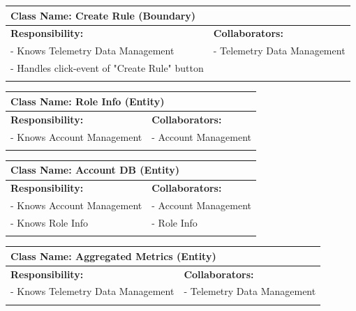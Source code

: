{	\begin{table}[H]
		\centering
		\begin{tabular}{|p{8cm}|p{8cm}|}
		\hline 
		 \multicolumn{2}{|l|}{\textbf{Class Name:} Create Rule (Boundary)} \\
		\hline
		\textbf{Responsibility:} & \textbf{Collaborators:} \\
		\hline
		 - Knows Telemetry Data Management & - Telemetry Data Management \\
		 - Handles click-event of "Create Rule" button\\ 
		\vspace{1in} & \\
		\hline
		\end{tabular}
	\end{table}

	\begin{table}[H]
		\centering
		\begin{tabular}{|p{8cm}|p{8cm}|}
		\hline 
		 \multicolumn{2}{|l|}{\textbf{Class Name:} Role Info (Entity)} \\
		\hline
		\textbf{Responsibility:} & \textbf{Collaborators:} \\
		\hline
		 - Knows Account  Management & - Account Management \\
		\vspace{1in} & \\
		\hline
		\end{tabular}
	\end{table}

	\begin{table}[H]
		\centering
		\begin{tabular}{|p{8cm}|p{8cm}|}
		\hline 
		 \multicolumn{2}{|l|}{\textbf{Class Name:} Account DB (Entity)} \\
		\hline
		\textbf{Responsibility:} & \textbf{Collaborators:} \\
		\hline
		 - Knows Account  Management & - Account Management \\
		 - Knows Role Info & - Role Info \\
		\vspace{1in} & \\
		\hline
		\end{tabular}
	\end{table}

	\begin{table}[H]
		\centering
		\begin{tabular}{|p{8cm}|p{8cm}|}
		\hline 
		 \multicolumn{2}{|l|}{\textbf{Class Name:} Aggregated Metrics (Entity)} \\
		\hline
		\textbf{Responsibility:} & \textbf{Collaborators:} \\
		\hline
		 - Knows Telemetry Data Management & - Telemetry Data Management \\
		\vspace{1in} & \\
		\hline
		\end{tabular}
	\end{table}

}
